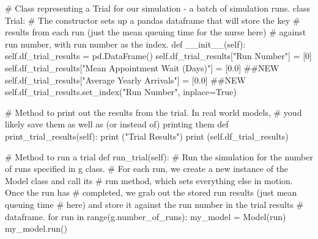 \documentclass[
  letterpaper,
  DIV=11,
  numbers=noendperiod]{scrreprt}
\newenvironment{Shaded}{}{}
\newcommand{\BuiltInTok}[1]{\textcolor[rgb]{0.84,0.23,0.29}{#1}}
\newcommand{\CommentTok}[1]{\textcolor[rgb]{0.42,0.45,0.49}{#1}}
\newcommand{\ControlFlowTok}[1]{\textcolor[rgb]{0.84,0.23,0.29}{#1}}
\newcommand{\DecValTok}[1]{\textcolor[rgb]{0.00,0.36,0.77}{#1}}
\newcommand{\FloatTok}[1]{\textcolor[rgb]{0.00,0.36,0.77}{#1}}
\newcommand{\FunctionTok}[1]{\textcolor[rgb]{0.44,0.26,0.76}{#1}}
\newcommand{\KeywordTok}[1]{\textcolor[rgb]{0.84,0.23,0.29}{#1}}
\newcommand{\NormalTok}[1]{\textcolor[rgb]{0.14,0.16,0.18}{#1}}
\newcommand{\OperatorTok}[1]{\textcolor[rgb]{0.14,0.16,0.18}{#1}}
\newcommand{\StringTok}[1]{\textcolor[rgb]{0.01,0.18,0.38}{#1}}
\newcommand{\VariableTok}[1]{\textcolor[rgb]{0.89,0.38,0.04}{#1}}
\begin{document}
\begin{Shaded}
\begin{Highlighting}[]
\CommentTok{\# Class representing a Trial for our simulation {-} a batch of simulation runs.}
\KeywordTok{class}\NormalTok{ Trial:}
    \CommentTok{\# The constructor sets up a pandas dataframe that will store the key}
    \CommentTok{\# results from each run (just the mean queuing time for the nurse here)}
    \CommentTok{\# against run number, with run number as the index.}
    \KeywordTok{def}  \FunctionTok{\_\_init\_\_}\NormalTok{(}\VariableTok{self}\NormalTok{):}
        \VariableTok{self}\NormalTok{.df\_trial\_results }\OperatorTok{=}\NormalTok{ pd.DataFrame()}
        \VariableTok{self}\NormalTok{.df\_trial\_results[}\StringTok{"Run Number"}\NormalTok{] }\OperatorTok{=}\NormalTok{ [}\DecValTok{0}\NormalTok{]}
        \VariableTok{self}\NormalTok{.df\_trial\_results[}\StringTok{"Mean Appointment Wait (Days)"}\NormalTok{] }\OperatorTok{=}\NormalTok{ [}\FloatTok{0.0}\NormalTok{] }\CommentTok{\#\#NEW}
        \VariableTok{self}\NormalTok{.df\_trial\_results[}\StringTok{"Average Yearly Arrivals"}\NormalTok{] }\OperatorTok{=}\NormalTok{ [}\FloatTok{0.0}\NormalTok{] }\CommentTok{\#\#NEW}
        \VariableTok{self}\NormalTok{.df\_trial\_results.set\_index(}\StringTok{"Run Number"}\NormalTok{, inplace}\OperatorTok{=}\VariableTok{True}\NormalTok{)}

    \CommentTok{\# Method to print out the results from the trial.  In real world models,}
    \CommentTok{\# you\textquotesingle{}d likely save them as well as (or instead of) printing them}
    \KeywordTok{def}\NormalTok{ print\_trial\_results(}\VariableTok{self}\NormalTok{):}
        \BuiltInTok{print}\NormalTok{ (}\StringTok{"Trial Results"}\NormalTok{)}
        \BuiltInTok{print}\NormalTok{ (}\VariableTok{self}\NormalTok{.df\_trial\_results)}

    \CommentTok{\# Method to run a trial}
    \KeywordTok{def}\NormalTok{ run\_trial(}\VariableTok{self}\NormalTok{):}
        \CommentTok{\# Run the simulation for the number of runs specified in g class.}
        \CommentTok{\# For each run, we create a new instance of the Model class and call its}
        \CommentTok{\# run method, which sets everything else in motion.  Once the run has}
        \CommentTok{\# completed, we grab out the stored run results (just mean queuing time}
        \CommentTok{\# here) and store it against the run number in the trial results}
        \CommentTok{\# dataframe.}
        \ControlFlowTok{for}\NormalTok{ run }\KeywordTok{in} \BuiltInTok{range}\NormalTok{(g.number\_of\_runs):}
\NormalTok{            my\_model }\OperatorTok{=}\NormalTok{ Model(run)}
\NormalTok{            my\_model.run()}


\end{Highlighting}
\end{Shaded}
\end{document}
